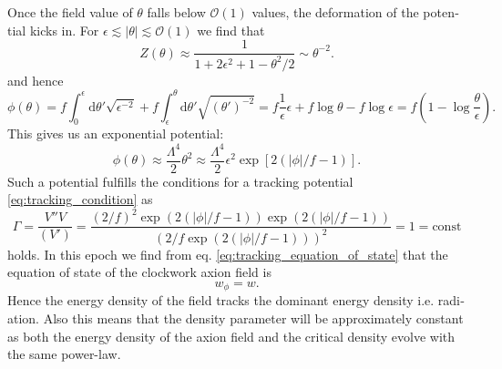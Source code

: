 \documentclass[master,       %
               twoside,        %
               BCOR10mm,       %
               english,ngerman, %
               ]{GAUBM}
\begin{document}
\begin{otherlanguage}{english}
Once the field value of $\theta$ falls below $\mathcal{O}(1)$ values, the deformation of the potential kicks in.
For $\epsilon \lesssim |\theta| \lesssim \mathcal{O}(1)$ we find that
\begin{equation}
	Z(\theta) \approx \frac{1}{1 + 2\epsilon^2 + 1 - \theta^2/2} \sim \theta^{-2}.
\end{equation}
and hence
\begin{equation}
	\phi(\theta) = f \int_0^\epsilon \mathrm{d} \theta' \sqrt{\epsilon^{-2}} + f \int_\epsilon^\theta \mathrm{d} \theta' \sqrt{ (\theta')^{-2}} = f \frac{1}{\epsilon} \epsilon + f \log \theta - f \log \epsilon = f \left(1 - \log \frac{\theta}{\epsilon}\right).
\end{equation}
This gives us an exponential potential:
\begin{equation}
	\phi(\theta) \approx \frac{\Lambda^4}{2} \theta^2 \approx \frac{\Lambda^4}{2} \epsilon^2 \exp \left[ 2 ( | \phi | / f - 1 ) \right].
\end{equation}
Such a potential fulfills the conditions for a tracking potential \eqref{eq:tracking_condition} as
\begin{equation}
	\Gamma = \frac{V'' V}{(V')} = \frac{(2/f)^2 \exp(2(|\phi| / f - 1)) \exp(2(|\phi| / f - 1))}{(2/f \exp(2(|\phi| / f - 1)))^2} = 1 = \mathrm{const}
\end{equation}
holds.
In this epoch we find from eq. \eqref{eq:tracking_equation_of_state} that the equation of state of the clockwork axion field is
\begin{equation}
	w_\phi = w.
\end{equation}
Hence the energy density of the field tracks the dominant energy density i.e. radiation.
Also this means that the density parameter will be approximately constant as both the energy density of the axion field and the critical density evolve with the same power-law.


\end{otherlanguage}
\end{document}

